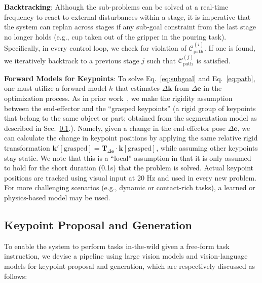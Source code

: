 \textbf{Backtracking}: Although the sub-problems can be solved at a real-time frequency to react to external disturbances within a stage, it is imperative that the system can replan across stages if any sub-goal constraint from the last stage no longer holds (e.g., cup taken out of the gripper in the pouring task). Specifically, in every control loop, we check for violation of $\mathcal{C}_{\text{path}}^{(i)}$. If one is found, we iteratively backtrack to a previous stage $j$ such that $\mathcal{C}_{\text{path}}^{(j)}$ is satisfied.

\textbf{Forward Models for Keypoints}:
To solve Eq.~\ref{eq:subgoal} and Eq.~\ref{eq:path}, one must utilize a forward model $h$ that estimates $\Delta \bm{k}$ from $\Delta \mathbf{e}$ in the optimization process.
As in prior work~\cite{manuelli2019kpam}, we make the rigidity assumption between the end-effector and the ``grasped keypoints'' (a rigid group of keypoints that belong to the same object or part; obtained from the segmentation model as described in Sec.~\ref{sec:vlm}.).
Namely, given a change in the end-effector pose $\Delta \mathbf{e}$, we can calculate the change in keypoint positions by applying the same relative rigid transformation $\bm{k}'[\text{grasped}] = \mathbf{T}_{\Delta \mathbf{e}} \cdot \bm{k}[\text{grasped}]$, while assuming other keypoints stay static.
We note that this is a ``local'' assumption in that it is only assumed to hold for the short duration (0.1s) that the problem is solved.
Actual keypoint positions are tracked using visual input at 20 Hz and used in every new problem.
For more challenging scenarios (e.g., dynamic or contact-rich tasks), a learned or physics-based model may be used.




\subsection{Keypoint Proposal and \algabrvname Generation}\label{sec:vlm}
To enable the system to perform tasks in-the-wild given a free-form task instruction, we devise a pipeline using large vision models and vision-language models for keypoint proposal and \algabrvname generation, which are respectively discussed as follows:

